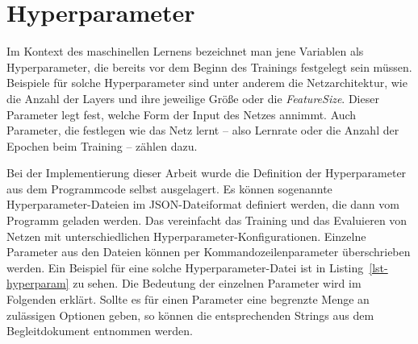   

\section{Hyperparameter}
\label{sec:hypp}


Im Kontext des maschinellen Lernens bezeichnet man jene Variablen als Hyperparameter, 
die bereits vor dem Beginn des Trainings festgelegt sein müssen.
Beispiele für solche Hyperparameter sind unter anderem die Netzarchitektur, wie die Anzahl der Layers und ihre jeweilige Größe 
oder die \textit{FeatureSize}.
Dieser Parameter legt fest, welche Form der Input des Netzes annimmt.
Auch Parameter, die festlegen wie das Netz lernt -- also Lernrate oder die Anzahl der Epochen beim Training -- zählen dazu.

Bei der Implementierung dieser Arbeit wurde die Definition der Hyperparameter aus dem Programmcode selbst ausgelagert.
Es können sogenannte Hyperparameter-Dateien im JSON-Dateiformat definiert werden, die dann vom Programm geladen werden.
Das vereinfacht das Training und das Evaluieren von Netzen mit unterschiedlichen Hyperparameter-Konfigurationen.
Einzelne Parameter aus den Dateien können per Kommandozeilenparameter überschrieben werden.
Ein Beispiel für eine solche Hyperparameter-Datei ist in Listing~\ref{lst-hyperparam} zu sehen.
Die Bedeutung der einzelnen Parameter wird im Folgenden erklärt. 
Sollte es für einen Parameter eine begrenzte Menge an zulässigen Optionen geben, 
so können die entsprechenden Strings aus dem Begleitdokument entnommen werden.


\newpage

